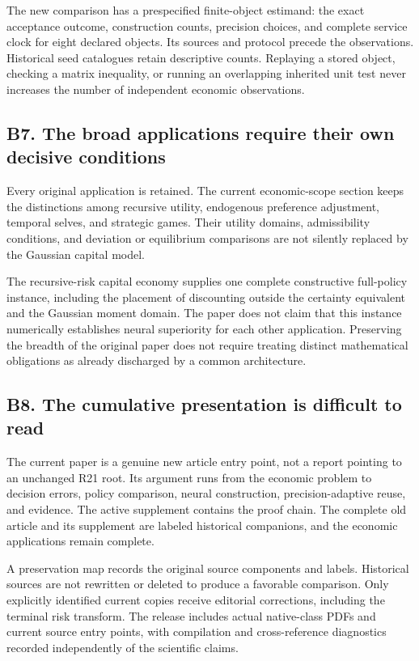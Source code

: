 \documentclass[ecta,nameyear,draft]{econsocart}
\theoremstyle{definition}
\theoremstyle{remark}
\begin{document}
The new comparison has a prespecified finite-object estimand: the exact acceptance outcome, construction counts, precision choices, and complete service clock for eight declared objects. Its sources and protocol precede the observations. Historical seed catalogues retain descriptive counts. Replaying a stored object, checking a matrix inequality, or running an overlapping inherited unit test never increases the number of independent economic observations.

\subsection*{B7. The broad applications require their own decisive conditions}

Every original application is retained. The current economic-scope section keeps the distinctions among recursive utility, endogenous preference adjustment, temporal selves, and strategic games. Their utility domains, admissibility conditions, and deviation or equilibrium comparisons are not silently replaced by the Gaussian capital model.

The recursive-risk capital economy supplies one complete constructive full-policy instance, including the placement of discounting outside the certainty equivalent and the Gaussian moment domain. The paper does not claim that this instance numerically establishes neural superiority for each other application. Preserving the breadth of the original paper does not require treating distinct mathematical obligations as already discharged by a common architecture.

\subsection*{B8. The cumulative presentation is difficult to read}

The current paper is a genuine new article entry point, not a report pointing to an unchanged R21 root. Its argument runs from the economic problem to decision errors, policy comparison, neural construction, precision-adaptive reuse, and evidence. The active supplement contains the proof chain. The complete old article and its supplement are labeled historical companions, and the economic applications remain complete.

A preservation map records the original source components and labels. Historical sources are not rewritten or deleted to produce a favorable comparison. Only explicitly identified current copies receive editorial corrections, including the terminal risk transform. The release includes actual native-class PDFs and current source entry points, with compilation and cross-reference diagnostics recorded independently of the scientific claims.
\end{document}
